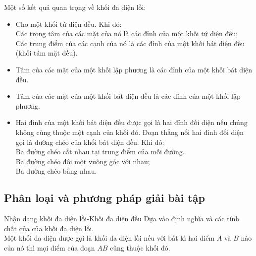 Một số kết quả quan trọng về khối đa diện lồi:
\begin{itemize}
	\item Cho một khối tứ diện đều. Khi đó:\\
	Các trọng tâm của các mặt của nó là các đỉnh của một khối tứ diện đều;\\
	Các trung điểm của các cạnh của nó là các đỉnh của một khối bát diện đều (khối tám mặt đều).
	\item Tâm của các mặt của một khối lập phương là các đỉnh của một khối bát diện đều.
	\item Tâm của các mặt của một khối bát diện đều là các đỉnh của một khối lập phương.
	\item Hai đỉnh của một khối bát diện đều được gọi là hai đỉnh đối diện nếu chúng không cùng thuộc một cạnh của khối đó. Đoạn thẳng nối hai đỉnh đối diện gọi là đường chéo của khối bát diện đều. Khi đó:\\
	Ba đường chéo cắt nhau tại trung điểm của mỗi đường.\\
	Ba đường chéo đôi một vuông góc với nhau;\\
	Ba đường chéo bằng nhau.
	\end{itemize}
\subsection{Phân loại và phương pháp giải bài tập}
\begin{dang}{Nhận dạng khối đa diện lồi-Khối đa diện đều}
	Dựa vào định nghĩa và các tính chất của của khối đa diện lồi.\\
	Một khối đa diện được gọi là khối đa diện lồi nếu với bất kì hai điểm $A$ và $B$ nào của nó thì mọi điểm của đoạn $AB$ cũng thuộc khối đó.
\end{dang}
